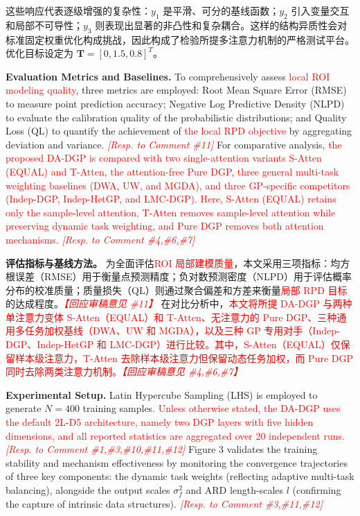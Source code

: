 \documentclass[11pt]{article}
\begin{document}
这些响应代表逐级增强的复杂性：$y_1$ 是平滑、可分的基线函数；$y_2$ 引入变量交互和局部不可导性；$y_3$ 则表现出显著的非凸性和复杂耦合。这样的结构异质性会对标准固定权重优化构成挑战，因此构成了检验所提多注意力机制的严格测试平台。优化目标设定为 $\mathbf{T}=[0, 1.5, 0.8]^T$。

\textbf{Evaluation Metrics and Baselines.} To comprehensively assess \textcolor{red}{local ROI modeling quality}, three metrics are employed: Root Mean Square Error (RMSE) to measure point prediction accuracy; Negative Log Predictive Density (NLPD) to evaluate the calibration quality of the probabilistic distributions; and Quality Loss (QL) to quantify the achievement of \textcolor{red}{the local RPD objective} by aggregating deviation and variance. \textcolor{red}{\textit{[Resp. to Comment \#11]}}
For comparative analysis, \textcolor{red}{the proposed DA-DGP is compared with two single-attention variants S-Atten (EQUAL) and T-Atten, the attention-free Pure DGP, three general multi-task weighting baselines (DWA, UW, and MGDA), and three GP-specific competitors (Indep-DGP, Indep-HetGP, and LMC-DGP). Here, S-Atten (EQUAL) retains only the sample-level attention, T-Atten removes sample-level attention while preserving dynamic task weighting, and Pure DGP removes both attention mechanisms. \textit{[Resp. to Comment \#4,\#6,\#7]}}

\textbf{评估指标与基线方法。} 为全面评估\textcolor{red}{ROI 局部建模质量}，本文采用三项指标：均方根误差（RMSE）用于衡量点预测精度；负对数预测密度（NLPD）用于评估概率分布的校准质量；质量损失（QL）则通过聚合偏差和方差来衡量\textcolor{red}{局部 RPD 目标}的达成程度。\textcolor{red}{\textit{【回应审稿意见 \#11】}}
在对比分析中，\textcolor{red}{本文将所提 DA-DGP 与两种单注意力变体 S-Atten（EQUAL）和 T-Atten、无注意力的 Pure DGP、三种通用多任务加权基线（DWA、UW 和 MGDA），以及三种 GP 专用对手（Indep-DGP、Indep-HetGP 和 LMC-DGP）进行比较。其中，S-Atten（EQUAL）仅保留样本级注意力，T-Atten 去除样本级注意力但保留动态任务加权，而 Pure DGP 同时去除两类注意力机制。\textit{【回应审稿意见 \#4,\#6,\#7】}}

\textbf{Experimental Setup.} Latin Hypercube Sampling (LHS) is employed to generate $N=400$ training samples. \textcolor{red}{Unless otherwise stated, the DA-DGP uses the default 2L-D5 architecture, namely two DGP layers with five hidden dimensions, and all reported statistics are aggregated over 20 independent runs. \textit{[Resp. to Comment \#1,\#3,\#10,\#11,\#12]}} Figure 3 validates the training stability and mechanism effectiveness by monitoring the convergence trajectories of three key components: the dynamic task weights (reflecting adaptive multi-task balancing), alongside the output scales $\sigma_f^2$ and ARD length-scales $l$ (confirming the capture of intrinsic data structures). \textcolor{red}{\textit{[Resp. to Comment \#3,\#11,\#12]}}
\end{document}
